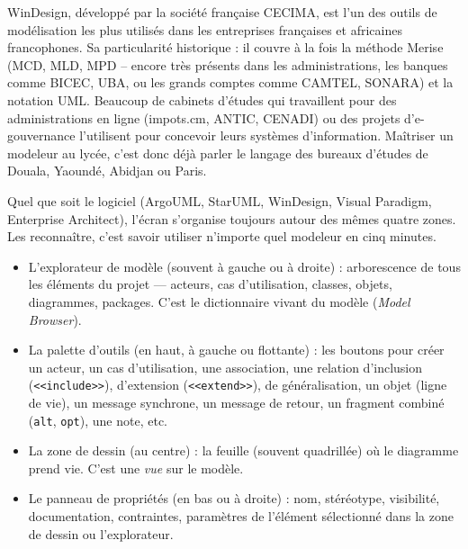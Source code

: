 \documentclass[11pt]{article}
\newcommand{\cle}[1]{{\popxbold\color{popdark}#1}}
\newcounter{popsec}
\newcounter{popsub}
\newcommand{\courssub}[1]{%
  \stepcounter{popsub}%
  \par\vspace{9pt}\noindent{\popxbold\fontsize{11.5}{13}\selectfont\color{popink}{\color{poporange}\thepopsec.\thepopsub}\hspace{6pt}#1}\par\nopagebreak\vspace{4pt}
}
\begin{document}
\begin{savaistu}
WinDesign, développé par la société française CECIMA, est l'un des outils de modélisation les plus utilisés dans les entreprises françaises et africaines francophones. Sa particularité historique : il couvre à la fois la méthode \cle{Merise} (MCD, MLD, MPD -- encore très présents dans les administrations, les banques comme BICEC, UBA, ou les grands comptes comme CAMTEL, SONARA) et la notation \cle{UML}. Beaucoup de cabinets d'études qui travaillent pour des administrations en ligne (impots.cm, ANTIC, CENADI) ou des projets d'e-gouvernance l'utilisent pour concevoir leurs systèmes d'information. Maîtriser un modeleur au lycée, c'est donc déjà parler le langage des bureaux d'études de Douala, Yaoundé, Abidjan ou Paris.
\end{savaistu}

\courssub{L'interface type d'un modeleur UML}

Quel que soit le logiciel (ArgoUML, StarUML, WinDesign, Visual Paradigm, Enterprise Architect), l'écran s'organise toujours autour des mêmes quatre zones. Les reconnaître, c'est savoir utiliser n'importe quel modeleur en cinq minutes.

\begin{itemize}
\item L'\cle{explorateur de modèle} (souvent à gauche ou à droite) : arborescence de tous les éléments du projet — acteurs, cas d'utilisation, classes, objets, diagrammes, packages. C'est le dictionnaire vivant du modèle (\emph{Model Browser}).
\item La \cle{palette d'outils} (en haut, à gauche ou flottante) : les boutons pour créer un acteur, un cas d'utilisation, une association, une relation d'inclusion (\texttt{<<include>>}), d'extension (\texttt{<<extend>>}), de généralisation, un objet (ligne de vie), un message synchrone, un message de retour, un fragment combiné (\texttt{alt}, \texttt{opt}), une note, etc.
\item La \cle{zone de dessin} (au centre) : la feuille (souvent quadrillée) où le diagramme prend vie. C'est une \emph{vue} sur le modèle.
\item Le panneau de \cle{propriétés} (en bas ou à droite) : nom, stéréotype, visibilité, documentation, contraintes, paramètres de l'élément sélectionné dans la zone de dessin ou l'explorateur.
\end{itemize}
\end{document}

